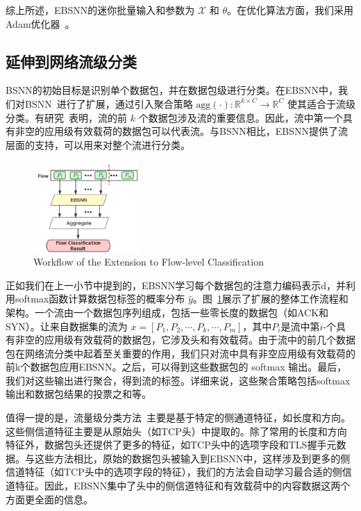\documentclass[degree=master,cjk-font=noto]{thuthesis}
\begin{document}
综上所述，EBSNN的迷你批量输入和参数为 $\mathcal{X}$ 和 $\theta$。在优化算法方面，我们采用Adam优化器~\cite{Adam}。

\subsection{延伸到网络流级分类}
\label{flow}

BSNN的初始目标是识别单个数据包，并在数据包级进行分类。在EBSNN中，我们对BSNN~\cite{bsnn}进行了扩展，通过引入聚合策略 $\text{agg}(\cdot): \mathbb{R}^{k \times C} \rightarrow \mathbb{R}^{C}$ 使其适合于流级分类。有研究~\cite{b12, MAAF}表明，流的前 $k$ 个数据包涉及流的重要信息。因此，流中第一个具有非空的应用级有效载荷的数据包可以代表流。与BSNN相比，EBSNN提供了流层面的支持，可以用来对整个流进行分类。

\begin{figure}[!tp]
	\centerline{\includegraphics[width=4cm]{BSNN_Extension_Flow.png}}
	\caption{Workflow of the Extension to Flow-level Classification}
	\label{fig_extension_flow}
\end{figure}

正如我们在上一小节中提到的，EBSNN学习每个数据包的注意力编码表示d，并利用softmax函数计算数据包标签的概率分布 $\hat{y}$。图~\ref{fig_extension_flow}展示了扩展的整体工作流程和架构。一个流由一个数据包序列组成，包括一些零长度的数据包（如ACK和SYN）。让来自数据集的流为 $x = [P_1, P_2, \cdots, P_k, \cdots, P_m]$，其中$P_i$是流中第$i$-个具有非空的应用级有效载荷的数据包，它涉及头和有效载荷。由于流中的前几个数据包在网络流分类中起着至关重要的作用，我们只对流中具有非空应用级有效载荷的前k个数据包应用EBSNN。之后，可以得到这些数据包的 softmax 输出。最后，我们对这些输出进行聚合，得到流的标签。详细来说，这些聚合策略包括softmax输出和数据包结果的投票之和等。

值得一提的是，流量级分类方法~\cite{b12, MAAF}主要是基于特定的侧通道特征，如长度和方向。这些侧信道特征主要是从原始头（如TCP头）中提取的。除了常用的长度和方向特征外，数据包头还提供了更多的特征，如TCP头中的选项字段和TLS握手元数据。与这些方法相比，原始的数据包头被输入到EBSNN中，这样涉及到更多的侧信道特征（如TCP头中的选项字段的特征），我们的方法会自动学习最合适的侧信道特征。因此，EBSNN集中了头中的侧信道特征和有效载荷中的内容数据这两个方面更全面的信息。
\end{document}
